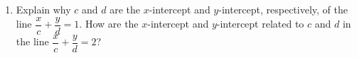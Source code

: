 \documentclass[11pt]{article}
\begin{document}
\begin{enumerate}
        \noindent Use the table of values below to determine $m$ and $b$ for $\displaystyle f(x) = mx + b$.


        \vspace{2ex}

        \noindent Find the value of $x$ or $y$ for which the line through $A$ and $B$ has the given slope $m$.


        \item Explain why $c$ and $d$ are the $x$-intercept and $y$-intercept, respectively, of the line $\dfrac{x}{c} + \dfrac{y}{d} = 1$. How are the $x$-intercept and $y$-intercept related to $c$ and $d$ in the line $\dfrac{x}{c} + \dfrac{y}{d} = 2$?


\end{enumerate}
\end{document}
